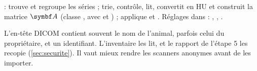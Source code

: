 \begin{danslecode}
 :
 trouve et regroupe les séries ;  trie, contrôle, lit, convertit en HU et
construit la matrice $\mt{A}$ (classe , avec  et ) ;
 applique  et . Réglages dans
 : , , .
\end{danslecode}

\begin{attention}[title={Données personnelles}]
L'en-tête DICOM contient souvent le nom de l'animal, parfois celui du propriétaire, et un identifiant. L'inventaire
les lit, et le rapport de l'étape 5 les recopie (\cref{sec:securite}). Il vaut mieux rendre les scanners anonymes avant
de les importer.
\end{attention}
